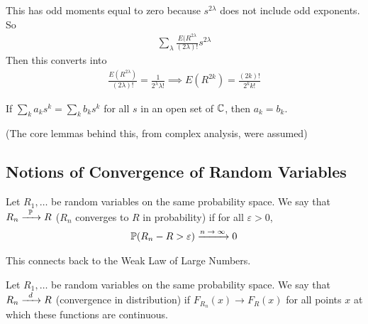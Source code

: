 \begin{enumerate}
\begin{solution}
        This has odd moments equal to zero because $s^{2\lambda}$ does not include odd exponents. So
        \begin{align}
            \sum_\lambda \frac{E(R^{2\lambda}}{(2\lambda)!}s^{2\lambda}
        \end{align}
        Then this converts into
        \begin{align}
            \frac{E(R^{2\lambda})}{(2\lambda)!} = \frac{1}{2^\lambda \lambda!} \implies \boxed{E(R^{2k}) = \frac{(2k)!}{2^{k}k!}}
        \end{align}
    \end{solution}
    \begin{aside}
        If $\sum_k a_k s^k = \sum_k b_k s^k$ for all $s$ in an open set of $\mathbb{C}$, then $a_k = b_k$.
    \end{aside}
    (The core lemmas behind this, from complex analysis, were assumed)
\end{enumerate}

\subsection{Notions of Convergence of Random Variables}
\begin{definition}
    Let $R_1, \ldots$ be random variables on the same probability space. We say that $R_n \ce{->[$\probability$]} R$ ($R_n$ converges to $R$ in probability) if for all $\varepsilon > 0$,
    \begin{align}
        \probability(R_n - R > \varepsilon) \ce{->[$n \to \infty$]} 0
    \end{align}
\end{definition}
This connects back to the Weak Law of Large Numbers.
\begin{definition}
    Let $R_1, \ldots$ be random variables on the same probability space. We say that $R_n \ce{->[$d$]} R$ (convergence in distribution) if $F_{R_n}(x) \to F_R(x)$ for all points $x$ at which these functions are continuous.
\end{definition}

